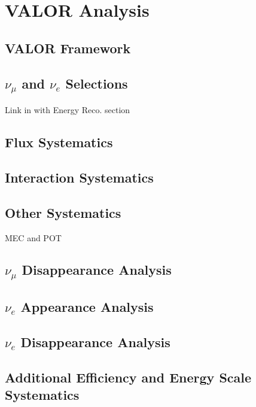 \chapter{VALOR Analysis}
\label{chap:VALOR}

\section{VALOR Framework}
\section{\texorpdfstring{$\nu_\mu$ and $\nu_e$ Selections}{numu and nue Selections}}
Link in with Energy Reco. section
\section{Flux Systematics}
\section{Interaction Systematics}
\section{Other Systematics}
MEC and POT
\section{\texorpdfstring{$\nu_\mu$ Disappearance Analysis}{numu Disappearance Analysis}}
\section{\texorpdfstring{$\nu_e$ Appearance Analysis}{nue Appearance Analysis}}
\section{\texorpdfstring{$\nu_e$ Disappearance Analysis}{nue Disappearance Analysis}}
\section{Additional Efficiency and Energy Scale Systematics}
